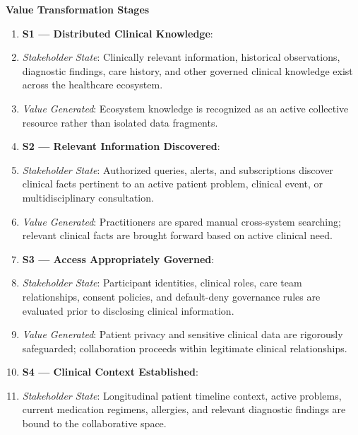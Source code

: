 \par\medskip\textbf{Value Transformation Stages}\par


\begin{enumerate}


\item \textbf{S1 — Distributed Clinical Knowledge}:

\item \emph{Stakeholder State}: Clinically relevant information, historical observations, diagnostic findings, care history, and other governed clinical knowledge exist across the healthcare ecosystem.

\item \emph{Value Generated}: Ecosystem knowledge is recognized as an active collective resource rather than isolated data fragments.

\item \textbf{S2 — Relevant Information Discovered}:

\item \emph{Stakeholder State}: Authorized queries, alerts, and subscriptions discover clinical facts pertinent to an active patient problem, clinical event, or multidisciplinary consultation.

\item \emph{Value Generated}: Practitioners are spared manual cross-system searching; relevant clinical facts are brought forward based on active clinical need.

\item \textbf{S3 — Access Appropriately Governed}:

\item \emph{Stakeholder State}: Participant identities, clinical roles, care team relationships, consent policies, and default-deny governance rules are evaluated prior to disclosing clinical information.

\item \emph{Value Generated}: Patient privacy and sensitive clinical data are rigorously safeguarded; collaboration proceeds within legitimate clinical relationships.

\item \textbf{S4 — Clinical Context Established}:

\item \emph{Stakeholder State}: Longitudinal patient timeline context, active problems, current medication regimens, allergies, and relevant diagnostic findings are bound to the collaborative space.


\end{enumerate}
